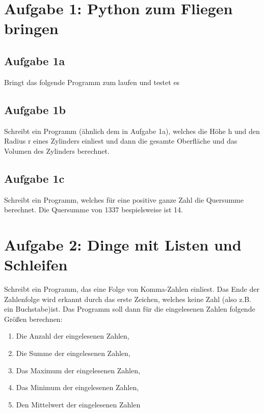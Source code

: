
\section{Aufgabe 1: Python zum Fliegen bringen}

\subsection{Aufgabe 1a}
Bringt das folgende Programm zum laufen und testet es

\subsection{Aufgabe 1b}
Schreibt ein Programm (ähnlich dem in Aufgabe 1a), welches die Höhe h und den Radius r
eines Zylinders einliest und dann die gesamte Oberfläche und das Volumen des Zylinders berechnet.

\subsection{Aufgabe 1c}
Schreibt ein Programm, welches für eine positive ganze Zahl die Quersumme
berechnet. Die Quersumme von 1337 bespielsweise ist 14.

\newpage
\section{Aufgabe 2: Dinge mit Listen und Schleifen}
Schreibt ein Programm, das eine Folge von Komma-Zahlen einliest. Das Ende
der Zahlenfolge wird erkannt durch das erste Zeichen, welches keine Zahl (also z.B. ein Buchstabe)ist.
Das Programm soll dann für die eingelesenen Zahlen folgende Größen berechnen:
\begin{enumerate}
\item Die Anzahl der eingelesenen Zahlen,
\item Die Summe der eingelesenen Zahlen,
\item Das Maximum der eingelesenen Zahlen,
\item Das Minimum der eingelesenen Zahlen,
\item Den Mittelwert der eingelesenen Zahlen
\end{enumerate}

\newpage